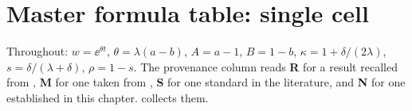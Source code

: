 \renewcommand{\thesection}{\thechapter.\Alph{section}}
\setcounter{section}{0}

\section{Master formula table: single cell}
\label{dist:app:formulae}

Throughout: $w=\ee^{\theta t}$, $\theta=\lambda(a-b)$, $A=a-1$, $B=1-b$,
$\kappa=1+\delta/(2\lambda)$, $s=\delta/(\lambda+\delta)$, $\rho=1-s$. The
provenance column reads \textbf{R} for a result recalled from \ChCore,
\textbf{M} for one taken from \ChM, \textbf{S} for one standard in the
literature, and \textbf{N} for one established in this chapter.
 collects them.

